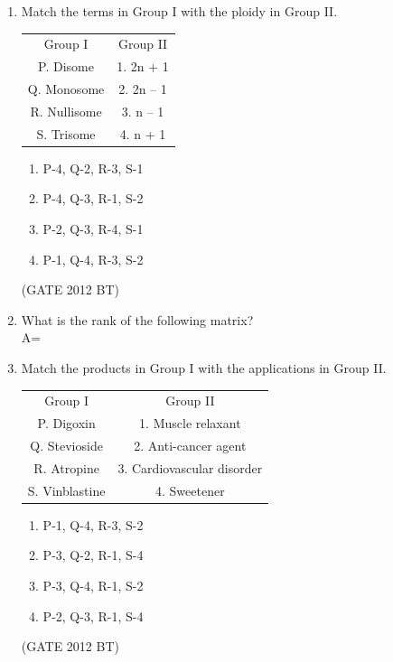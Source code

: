 \documentclass[journal,12pt,onecolumn]{IEEEtran}
\theoremstyle{remark}
\begin{document}
\begin{enumerate}
\item 	Match the terms in Group I with the ploidy in Group II.

    \begin{tabular}{c c}
    Group I&	Group II\\
P.	Disome	&1.	2n + 1\\
Q.	Monosome&	2.	2n – 1\\
R.	Nullisome&	3.	n – 1\\
S.	Trisome	&4.	n + 1
  \end{tabular}

\begin{multicols}{2}
\begin{enumerate}
\item P-4, Q-2, R-3, S-1	
\item  P-4, Q-3, R-1, S-2
\item  P-2, Q-3, R-4, S-1
\item  P-1, Q-4, R-3, S-2
\end{enumerate}
\end{multicols} \hfill(GATE 2012 BT)

\item What is the rank of the following matrix?\\
 A= 

\item Match the products in Group I with the applications in Group II.\\
    \begin{tabular}{c c}
    Group I&	Group II\\
P.	Digoxin	&1.	Muscle relaxant\\
Q.	Stevioside	&2.	Anti-cancer agent\\
R.	Atropine	&3.	Cardiovascular disorder\\
S.	Vinblastine	&4.	Sweetener
\end{tabular}
\begin{multicols}{2}
\begin{enumerate}
\item 	P-1, Q-4, R-3, S-2
\item P-3, Q-2, R-1, S-4
\item  P-3, Q-4, R-1, S-2	
\item  P-2, Q-3, R-1, S-4
\end{enumerate}
\end{multicols} \hfill(GATE 2012 BT)




\end{enumerate}
\end{document}
